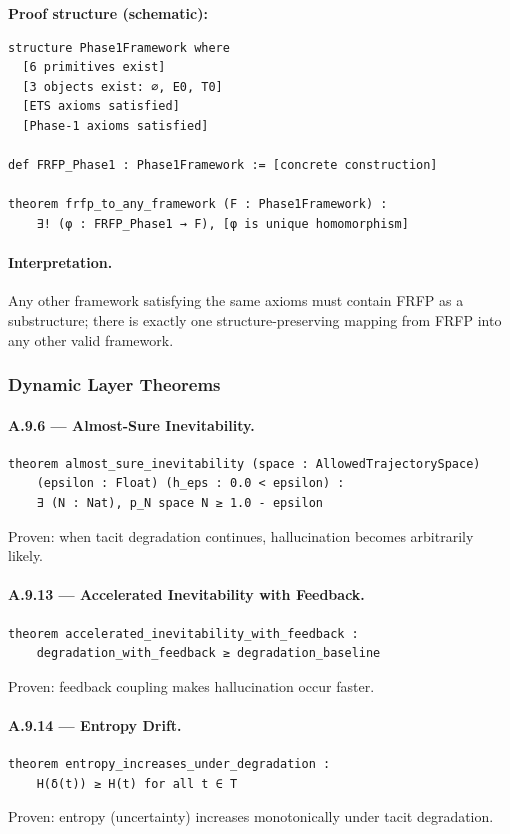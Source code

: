 \textbf{Proof structure (schematic):}
\begin{verbatim}
structure Phase1Framework where
  [6 primitives exist]
  [3 objects exist: ∅, E0, T0]
  [ETS axioms satisfied]
  [Phase-1 axioms satisfied]

def FRFP_Phase1 : Phase1Framework := [concrete construction]

theorem frfp_to_any_framework (F : Phase1Framework) :
    ∃! (φ : FRFP_Phase1 → F), [φ is unique homomorphism]
\end{verbatim}

\paragraph{Interpretation.}
Any other framework satisfying the same axioms must contain FRFP as a substructure; there is exactly one structure-preserving mapping from FRFP into any other valid framework.

\subsubsection{Dynamic Layer Theorems \checkmark}
\paragraph{A.9.6 — Almost-Sure Inevitability.}
\begin{verbatim}
theorem almost_sure_inevitability (space : AllowedTrajectorySpace)
    (epsilon : Float) (h_eps : 0.0 < epsilon) :
    ∃ (N : Nat), p_N space N ≥ 1.0 - epsilon
\end{verbatim}
Proven: when tacit degradation continues, hallucination becomes arbitrarily likely.

\paragraph{A.9.13 — Accelerated Inevitability with Feedback.}
\begin{verbatim}
theorem accelerated_inevitability_with_feedback :
    degradation_with_feedback ≥ degradation_baseline
\end{verbatim}
Proven: feedback coupling makes hallucination occur faster.

\paragraph{A.9.14 — Entropy Drift.}
\begin{verbatim}
theorem entropy_increases_under_degradation :
    H(δ(t)) ≥ H(t) for all t ∈ T
\end{verbatim}
Proven: entropy (uncertainty) increases monotonically under tacit degradation.

